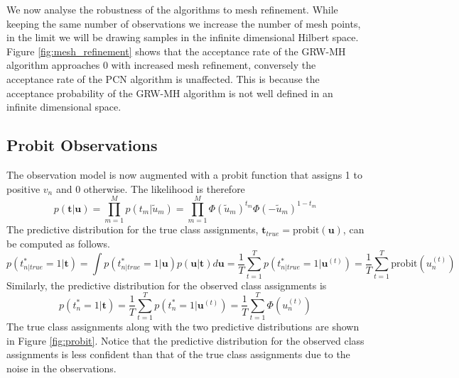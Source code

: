 \documentclass[11pt]{article}
\begin{document}
We now analyse the robustness of the algorithms to mesh refinement. While keeping the same number of observations we increase the number of mesh points, in the limit we will be drawing samples in the infinite dimensional Hilbert space. Figure \ref{fig:mesh_refinement} shows that the acceptance rate of the GRW-MH algorithm approaches 0 with increased mesh refinement, conversely the acceptance rate of the PCN algorithm is unaffected. This is because the acceptance probability of the GRW-MH algorithm is not well defined in an infinite dimensional space.

\subsection{Probit Observations}
The observation model is now augmented with a probit function that assigns 1 to positive $v_n$ and 0 otherwise. The likelihood is therefore
\begin{equation}
    p(\boldsymbol{t} | \boldsymbol{u}) = \prod_{m=1}^{M} p(t_m | \tilde{u}_m) = \prod_{m=1}^{M} \Phi(\tilde{u}_m)^{t_m} \Phi(-\tilde{u}_m)^{1-t_m}
\end{equation}
The predictive distribution for the true class assignments, $\boldsymbol{t}_{true} = \text{probit}(\boldsymbol{u})$, can be computed as follows.
\begin{equation}
    p(t_{n|true}^*=1|\boldsymbol{t}) = \int p(t_{n|true}^*=1 | \boldsymbol{u}) p(\boldsymbol{u} | \boldsymbol{t}) d\boldsymbol{u} = \frac{1}{T} \sum_{t=1}^{T} p(t_{n|true}^*=1 | \boldsymbol{u}^{(t)}) = \frac{1}{T} \sum_{t=1}^{T} \text{probit}(u^{(t)}_n)
\end{equation}
Similarly, the predictive distribution for the observed class assignments is
\begin{equation}
    p(t_{n}^*=1|\boldsymbol{t}) = \frac{1}{T} \sum_{t=1}^{T} p(t_{n}^*=1 | \boldsymbol{u}^{(t)}) = \frac{1}{T} \sum_{t=1}^{T} \Phi(u^{(t)}_n)
\end{equation}
The true class assignments along with the two predictive distributions are shown in Figure \ref{fig:probit}. Notice that the predictive distribution for the observed class assignments is less confident than that of the true class assignments due to the noise in the observations.
\end{document}
